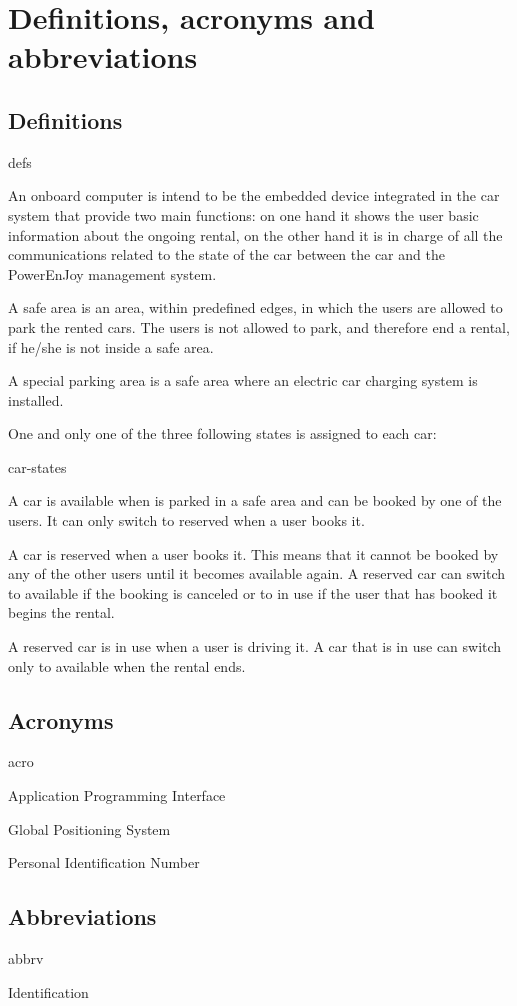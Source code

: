 \section{Definitions, acronyms and abbreviations}

\subsection{Definitions}
	\begin{labeling}{defs}
		\item[\textbf{Onboard computer}] An onboard computer is intend to be the embedded device integrated in the car system that provide two main functions: on one hand it shows the user basic information about the ongoing rental, on the other hand it is in charge of all the communications related to the state of the car between the car and the PowerEnJoy management system.
		\item[\textbf{Safe area}] A safe area is an area, within predefined edges, in which the users are allowed to park the rented cars. The users is not allowed to park, and therefore end a rental, if he/she is not inside a safe area.
		\item[\textbf{Special parking area}] A special parking area is a safe area where an electric car charging system is installed.
		\item[\textbf{Car states}] One and only one of the three following states is assigned to each car:
			\begin{labeling}{car-states}
				\item[\textbf{Available}] A car is available when is parked in a safe area and can be booked by one of the users. It can only switch to reserved when a user books it.
				\item[\textbf{Reserved}] A car is reserved when a user books it. This means that it cannot be booked by any of the other users until it becomes available again. A reserved car can switch to available if the booking is canceled or to in use if the user that has booked it begins the rental.
				\item[\textbf{In use}] A reserved car is in use when a user is driving it. A car that is in use can switch only to available when the rental ends.
			\end{labeling}
	\end{labeling}

\subsection{Acronyms}
	\begin{labeling}{acro}
		\item[\textbf{API}] Application Programming Interface
		\item[\textbf{GPS}] Global Positioning System
		\item[\textbf{PIN}] Personal Identification Number
	\end{labeling}

\subsection{Abbreviations}
	\begin{labeling}{abbrv}
		\item[\textbf{ID}] Identification
	\end{labeling}